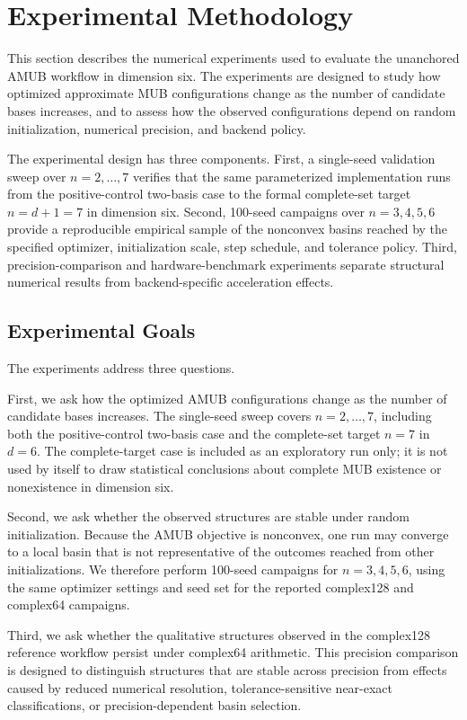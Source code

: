 \documentclass[a4paper,twocolumn,11pt,amsfonts,amssymb]{quantumarticle}
\begin{document}
\section{Experimental Methodology}
\label{sec:experimental-methodology}

This section describes the numerical experiments used to evaluate the unanchored AMUB workflow in dimension six. The experiments are designed to study how optimized approximate MUB configurations change as the number of candidate bases increases, and to assess how the observed configurations depend on random initialization, numerical precision, and backend policy.

The experimental design has three components. First, a single-seed validation sweep over \(n=2,\ldots,7\) verifies that the same parameterized implementation runs from the positive-control two-basis case to the formal complete-set target \(n=d+1=7\) in dimension six. Second, 100-seed campaigns over \(n=3,4,5,6\) provide a reproducible empirical sample of the nonconvex basins reached by the specified optimizer, initialization scale, step schedule, and tolerance policy. Third, precision-comparison and hardware-benchmark experiments separate structural numerical results from backend-specific acceleration effects.

\subsection{Experimental Goals}

The experiments address three questions.

First, we ask how the optimized AMUB configurations change as the number of candidate bases increases. The single-seed sweep covers \(n=2,\ldots,7\), including both the positive-control two-basis case and the complete-set target \(n=7\) in \(d=6\). The complete-target case is included as an exploratory run only; it is not used by itself to draw statistical conclusions about complete MUB existence or nonexistence in dimension six.

Second, we ask whether the observed structures are stable under random initialization. Because the AMUB objective is nonconvex, one run may converge to a local basin that is not representative of the outcomes reached from other initializations. We therefore perform 100-seed campaigns for \(n=3,4,5,6\), using the same optimizer settings and seed set for the reported complex128 and complex64 campaigns.

Third, we ask whether the qualitative structures observed in the complex128 reference workflow persist under complex64 arithmetic. This precision comparison is designed to distinguish structures that are stable across precision from effects caused by reduced numerical resolution, tolerance-sensitive near-exact classifications, or precision-dependent basin selection.
\end{document}
